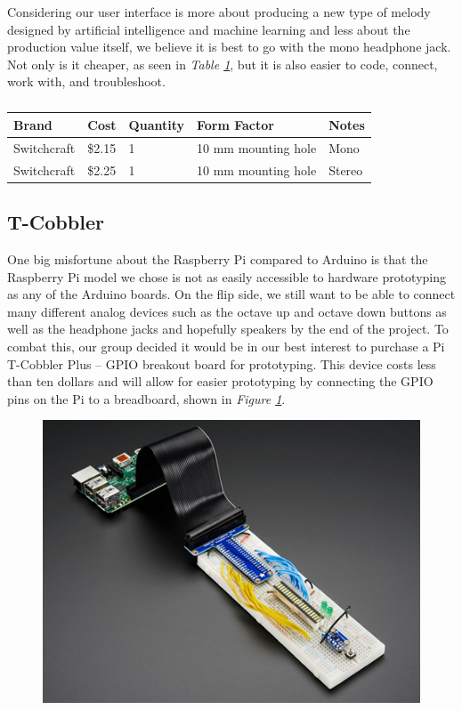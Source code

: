 Considering our user interface is more about producing a new type of melody designed by artificial intelligence and machine learning and less about the production value itself, we believe it is best to go with the mono headphone jack. Not only is it cheaper, as seen in \textit{Table \ref{Tab:jack_brand}}, but it is also easier to code, connect, work with, and troubleshoot.

\begin{table}[]
  \centering
  \begin{tabular}{|l|l|l|l|l|}
    \hline
    Brand       & Cost   & Quantity & Form Factor         & Notes  \\ \hline
    Switchcraft & \$2.15 & 1        & 10 mm mounting hole & Mono   \\ \hline
    Switchcraft & \$2.25 & 1        & 10 mm mounting hole & Stereo \\ \hline
  \end{tabular}
  \caption{}
  \label{Tab:jack_brand}
\end{table}

\subsection{T-Cobbler}

One big misfortune about the Raspberry Pi compared to Arduino is that the Raspberry Pi model we chose is not as easily accessible to hardware prototyping as any of the Arduino boards. On the flip side, we still want to be able to connect many different analog devices such as the octave up and octave down buttons as well as the headphone jacks and hopefully speakers by the end of the project. To combat this, our group decided it would be in our best interest to purchase a Pi T-Cobbler Plus -- GPIO breakout board for prototyping. This device costs less than ten dollars and will allow for easier prototyping by connecting the GPIO pins on the Pi to a breadboard, shown in \textit{Figure \ref{fig:tcobbler}}.

\begin{figure}[h!]
  \centering
  \includegraphics[width=\linewidth]{image/TCobbler.png}
  \caption{}
  \label{fig:tcobbler}
\end{figure}
\newpage

